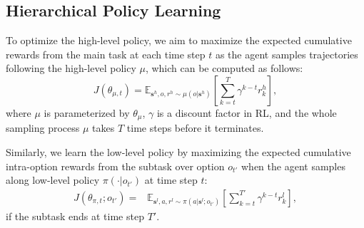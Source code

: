 \documentclass[letterpaper]{article} %
\theoremstyle{definition}
\begin{document}


\subsection{Hierarchical Policy Learning}

To optimize the high-level policy, we aim to maximize the expected cumulative rewards from the main task at each time step $t$ as the agent samples trajectories following the high-level policy $\mu$, which can be computed as follows:
\begin{equation}\label{return_high}
    J(\theta_{\mu,t}) = \mathbb{E}_{\mathbf{s}^h,o,r^h \sim \mu(o|\mathbf{s}^h)} [\sum_{k=t}^T \gamma^{k-t} r_k^h], %
\end{equation}
where $\mu$ is parameterized by $\theta_\mu$, $\gamma$ is a discount factor in RL, and the whole sampling process $\mu$ takes $T$ time steps before it terminates.

Similarly, we learn the low-level policy by maximizing the expected cumulative intra-option rewards from the subtask over option $o_{t'}$ when the agent samples along low-level policy $\pi(\cdot|o_{t'})$ at time step $t$:
\begin{equation}\label{return_low}
    \begin{split}
        J(\theta_{\pi,t};o_{t'}) =& \mathbb{E}_{\mathbf{s}^l,a,r^l \sim \pi(a|\mathbf{s}^l;o_{t'})} [\sum_{k=t}^{T'} \gamma^{k-t} r_k^l ], %
    \end{split}
\end{equation}
if the subtask ends at time step $T'$.
\end{document}
